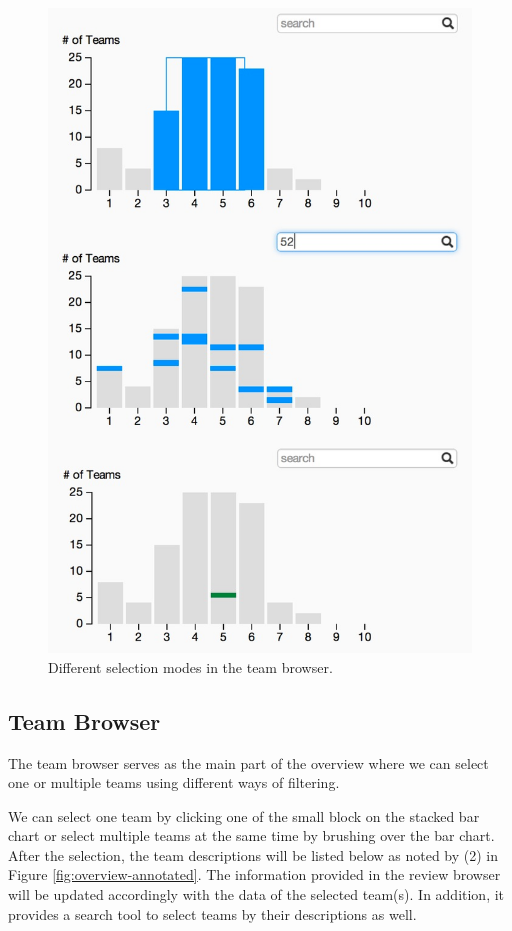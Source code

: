 \documentclass{sigchi}
\begin{document}
\begin{figure}[tb]
\centering
\includegraphics[width=\columnwidth]{images/3charts}
\caption{Different selection modes in the team browser.}
\label{fig:keyword-lists}
\end{figure}

\subsection{Team Browser}
The team browser serves as the main part of the overview
where we can select one or multiple teams using different ways of filtering.

We can select one team by clicking one of the small block on the stacked bar
chart or select multiple teams at the same time by brushing over the bar chart.
After the selection, the team descriptions will be listed below as noted by (2)
in Figure \ref{fig:overview-annotated}. The information provided in the review
browser will be updated accordingly with the data of the selected team(s). In
addition, it provides a search tool to select teams by their descriptions as
well.
\end{document}
